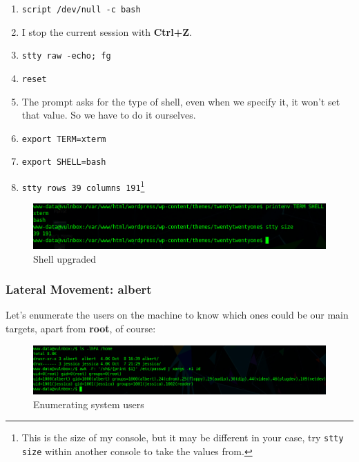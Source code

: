 \documentclass[12pt]{article}
\begin{document}
    \begin{enumerate}
        \item \verb!script /dev/null -c bash!
        \item I stop the current session with \textbf{Ctrl+Z}.
        \item \verb!stty raw -echo; fg!
        \item \verb!reset!
        \item The prompt asks for the type of shell, even when we specify it,
            it won't set that value. So we have to do it ourselves.
        \item \verb!export TERM=xterm!
        \item \verb!export SHELL=bash!
        \item \verb!stty rows 39 columns 191!\footnote{This is the size of my
            console, but it may be different in your case, try \texttt{stty size}
            within another console to take the values from.}
    \end{enumerate}

    \begin{figure}[H]\label{pic:39-fully-upgraded-shell}
        \centering
        \includegraphics[width=1.00\textwidth]{39-fully-upgraded-shell.png}
        \caption{Shell upgraded}
    \end{figure}

\pagebreak
\subsubsection{Lateral Movement: albert}

    Let's enumerate the users on the machine to know which ones could be our
    main targets, apart from \textbf{root}, of course:

    \begin{figure}[H]\label{pic:40-enumerating-users}
        \centering
        \includegraphics[width=1.00\textwidth]{40-enumerating-users.png}
        \caption{Enumerating system users}
    \end{figure}
\end{document}
